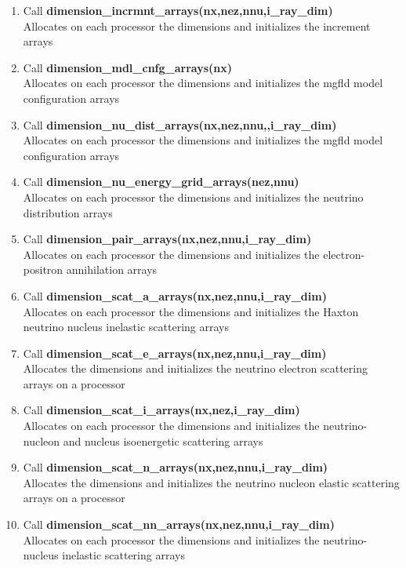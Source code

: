 \documentclass[11pt,doublespace]{article}
\begin{document}
\begin{itemize}
\begin{enumerate}
\begin{enumerate}
\begin{enumerate}
\begin{enumerate}
  \item Call {\bf dimension\_incrmnt\_arrays(nx,nez,nnu,i\_ray\_dim)}\\
    Allocates on each processor  the dimensions and initializes the increment arrays
  \item Call {\bf dimension\_mdl\_cnfg\_arrays(nx)}\\
    Allocates on each processor  the dimensions and initializes the mgfld model configuration arrays
  \item Call {\bf dimension\_nu\_dist\_arrays(nx,nez,nnu,,i\_ray\_dim)}\\
    Allocates on each processor  the dimensions and initializes the mgfld model configuration arrays
  \item Call {\bf dimension\_nu\_energy\_grid\_arrays(nez,nnu)}\\
    Allocates on each processor  the dimensions and initializes the neutrino distribution arrays
  \item Call {\bf dimension\_pair\_arrays(nx,nez,nnu,i\_ray\_dim)}\\
    Allocates on each processor  the dimensions and initializes the electron-positron annihilation arrays
  \item Call {\bf dimension\_scat\_a\_arrays(nx,nez,nnu,i\_ray\_dim)}\\
    Allocates on each processor  the dimensions and initializes the Haxton neutrino nucleus inelastic scattering arrays
  \item Call {\bf dimension\_scat\_e\_arrays(nx,nez,nnu,i\_ray\_dim)}\\
    Allocates  the dimensions and initializes the neutrino electron scattering arrays on a processor
  \item Call {\bf dimension\_scat\_i\_arrays(nx,nez,i\_ray\_dim)}\\
    Allocates on each processor  the dimensions and initializes the neutrino-nucleon and nucleus isoenergetic scattering arrays
  \item Call {\bf dimension\_scat\_n\_arrays(nx,nez,nnu,i\_ray\_dim)}\\
    Allocates  the dimensions and initializes the neutrino nucleon elastic scattering arrays on a processor
  \item Call {\bf dimension\_scat\_nn\_arrays(nx,nez,nnu,i\_ray\_dim)}\\
    Allocates on each processor  the dimensions and initializes the neutrino-nucleus inelastic scattering arrays
\end{enumerate}

\end{enumerate}
\end{enumerate}
\end{enumerate}
\end{itemize}
\end{document}
